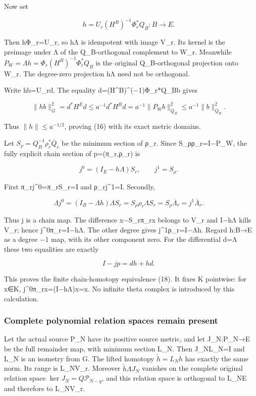 Now set

\[
h=U_r(H^B)^{-1}\Phi_r^*Q_B:B\longrightarrow E. \tag{F15}
\]

Then hΦ\_r=U\_r, so hΛ is idempotent with image V\_r. Its kernel is the preimage under Λ of the Q\_B-orthogonal complement to W\_r. Meanwhile \(P_W=\Lambda h=\Phi_r(H^B)^{-1}\Phi_r^*Q_B\) is the original Q\_B-orthogonal projection onto W\_r. The degree-zero projection hΛ need not be orthogonal.

Write hb=U\_rd. The equality d=(H\^{}B)\^{}(−1)Φ\_r*Q\_Bb gives

\[
\|hb\|_G^2=d^*H^Ed\le a^{-1}d^*H^Bd
=a^{-1}\|P_Wb\|_{Q_B}^2\le a^{-1}\|b\|_{Q_B}^2.
\]

Thus \(\|h\|\le a^{-1/2}\), proving (16) with its exact metric domains.

Let \(S_\rho=Q_B^{-1}\rho_r^*\overline Q_r\) be the minimum section of ρ\_r. Since S\_ρρ\_r=I−P\_W, the fully explicit chain section of p=(π\_r,ρ\_r) is

\[
j^0=(I_E-h\Lambda)S_r,
\qquad j^1=S_\rho. \tag{F17a}
\]

First π\_rj\^{}0=π\_rS\_r=I and ρ\_rj\^{}1=I. Secondly,

\[
\Lambda j^0=(I_B-\Lambda h)\Lambda S_r
=S_\rho\rho_r\Lambda S_r
=S_\rho\overline\Lambda_r=j^1\overline\Lambda_r.
\]

Thus j is a chain map. The difference x−S\_rπ\_rx belongs to V\_r and I−hΛ kills V\_r; hence j\^{}0π\_r=I−hΛ. The other degree gives j\^{}1ρ\_r=I−Λh. Regard h:B→E as a degree −1 map, with its other component zero. For the differential d=Λ these two equalities are exactly

\[
I-jp=dh+hd. \tag{F17b}
\]

This proves the finite chain-homotopy equivalence (18). It fixes K pointwise: for x∈K, j\^{}0π\_rx=(I−hΛ)x=x. No infinite theta complex is introduced by this calculation.

\subsubsection{Complete polynomial relation spaces remain present}\label{complete-polynomial-relation-spaces-remain-present}

Let the actual source P\_N have its positive source metric, and let J\_N:P\_N→E be the full remainder map, with minimum section L\_N. Then J\_NL\_N=I and L\_N is an isometry from G. The lifted homotopy \(\widetilde h=L_Nh\) has exactly the same norm. Its range is L\_NV\_r. Moreover \(\widetilde h\Lambda J_N\) vanishes on the complete original relation space \(\ker J_N=Q\mathcal P_{N-q}\), and this relation space is orthogonal to L\_NE and therefore to L\_NV\_r.

